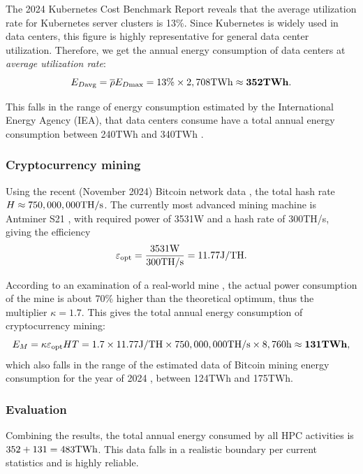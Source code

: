 \documentclass[12pt]{article}
\begin{document}
The 2024 Kubernetes Cost Benchmark Report \citep{kubernetes_report} reveals that the average utilization rate for Kubernetes server clusters is 13\%. Since Kubernetes is widely used in data centers, this figure is highly representative for general data center utilization. Therefore, we get the annual energy consumption of data centers at \textit{average utilization rate}:
\begin{equation}
	E_{D \rm avg} = \overline{\rho} E_{D \rm max}
	= \rm 13\% \times 2,708TWh \approx \mathbf{352TWh}.
\end{equation}

This falls in the range of energy consumption estimated by the International Energy Agency (IEA), that data centers consume have a total annual energy consumption between 240TWh and 340TWh \citep{IEA2024}.

\subsubsection{Cryptocurrency mining}

Using the recent (November 2024) Bitcoin network data \citep{hashrate}, the total hash rate $H \approx \rm 750,000,000TH/s$. The currently most advanced mining machine is Antminer S21 \citep{best_miner}, with required power of 3531W and a hash rate of 300TH/s, giving the efficiency
\begin{equation}
	\varepsilon_{\rm opt} = \rm \frac{3531W}{300TH/s} = 11.77J/TH.
\end{equation}

According to an examination of a real-world mine \citep{miner_avg_eff}, the actual power consumption of the mine is about 70\% higher than the theoretical optimum, thus the multiplier $\kappa = 1.7$. This gives the total annual energy consumption of cryptocurrency mining:
\begin{equation}
	E_M = \kappa \varepsilon_{\rm opt} HT
	= \rm 1.7 \times 11.77J/TH \times 750,000,000TH/s \times 8,760h \approx \mathbf{131TWh},
\end{equation}
which also falls in the range of the estimated data of Bitcoin mining energy consumption for the year of 2024 \citep{digiconomist}, between 124TWh and 175TWh.

\subsubsection{Evaluation}

Combining the results, the total annual energy consumed by all HPC activities is $352 + 131 = 483 \rm TWh$. This data falls in a realistic boundary per current statistics and is highly reliable.
\end{document}
